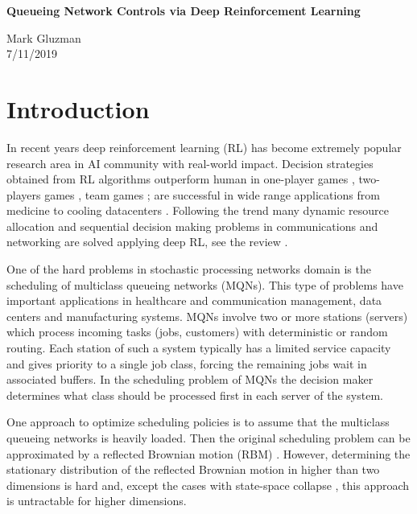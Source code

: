 \documentclass[11pt]{article}
\theoremstyle{definition}
\numberwithin{equation}{section}
\begin{document}
\begin{center}
  \large \bf
Queueing Network Controls via Deep Reinforcement Learning
\end{center}
\begin{center}
  Mark Gluzman \\
  7/11/2019
\end{center}






\section{Introduction}



In recent years deep reinforcement learning (RL) has become extremely popular research area in AI community with real-world impact. Decision strategies obtained from RL algorithms outperform human in one-player games \cite{Bellemare2013, Mnih2015}, two-players games \cite{Silver2017},  team games \cite{OpenAI2019}; are successful in wide range applications from medicine \cite{Komorowski2018} to  cooling datacenters \cite{DeepMind2016a}. Following the trend many dynamic resource allocation and sequential decision making problems in communications and networking are solved applying deep RL, see the review \cite{CongLuong}.



 One of the hard problems in stochastic processing networks domain is the scheduling of multiclass queueing networks (MQNs). This type of problems have important applications in healthcare and communication management,  data centers and manufacturing systems. MQNs involve  two or more stations (servers) which process incoming tasks (jobs, customers) with deterministic or random routing. Each station of such a system typically has a limited service capacity and gives priority to a single job class, forcing the remaining jobs wait in  associated buffers. In the scheduling problem of MQNs the decision maker determines what class should be processed first in each server of the system. 





One  approach to optimize scheduling policies is to assume that the multiclass queueing networks is heavily loaded. Then the original scheduling problem can be approximated by a reflected Brownian motion (RBM) \cite{Harrison1988, Harrison1989, Wein1990}.  However, determining the stationary distribution of the reflected Brownian motion in higher than two dimensions is hard and, except the cases with state-space collapse \cite{Williams1998, Laws1990}, this approach is untractable for higher dimensions.
\end{document}
